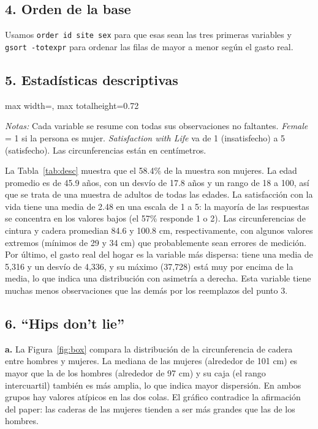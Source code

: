 \documentclass[11pt,a4paper]{article}
\newcommand{\tabla}[1]{\begin{adjustbox}{max width=\linewidth, max totalheight=0.72\textheight}\end{adjustbox}}
\newcommand{\notas}[1]{\par\vspace{0.3em}\begin{minipage}{0.92\linewidth}\footnotesize\textit{Notas:} #1\end{minipage}}
\begin{document}
\subsection*{4. Orden de la base}

Usamos \texttt{order id site sex} para que esas sean las tres primeras variables y \texttt{gsort -totexpr} para ordenar las filas de mayor a menor según el gasto real.

\subsection*{5. Estadísticas descriptivas}

\begin{table}[H]\centering
\caption{Estadísticas descriptivas}\label{tab:desc}
\tabla{"../output/Tabla 1 - Ejercicio 5.tex"}
\notas{Cada variable se resume con todas sus observaciones no faltantes. \textit{Female} = 1 si la persona es mujer. \textit{Satisfaction with Life} va de 1 (insatisfecho) a 5 (satisfecho). Las circunferencias están en centímetros.}
\end{table}

La Tabla~\ref{tab:desc} muestra que el 58.4\% de la muestra son mujeres. La edad promedio es de 45.9 años, con un desvío de 17.8 años y un rango de 18 a 100, así que se trata de una muestra de adultos de todas las edades. La satisfacción con la vida tiene una media de 2.48 en una escala de 1 a 5: la mayoría de las respuestas se concentra en los valores bajos (el 57\% responde 1 o 2). Las circunferencias de cintura y cadera promedian 84.6 y 100.8 cm, respectivamente, con algunos valores extremos (mínimos de 29 y 34 cm) que probablemente sean errores de medición. Por último, el gasto real del hogar es la variable más dispersa: tiene una media de 5,316 y un desvío de 4,336, y su máximo (37,728) está muy por encima de la media, lo que indica una distribución con asimetría a derecha. Esta variable tiene muchas menos observaciones que las demás por los reemplazos del punto 3.

\subsection*{6. ``Hips don't lie''}

\textbf{a.} La Figura~\ref{fig:box} compara la distribución de la circunferencia de cadera entre hombres y mujeres. La mediana de las mujeres (alrededor de 101 cm) es mayor que la de los hombres (alrededor de 97 cm) y su caja (el rango intercuartil) también es más amplia, lo que indica mayor dispersión. En ambos grupos hay valores atípicos en las dos colas. El gráfico contradice la afirmación del paper: las caderas de las mujeres tienden a ser más grandes que las de los hombres.
\end{document}

